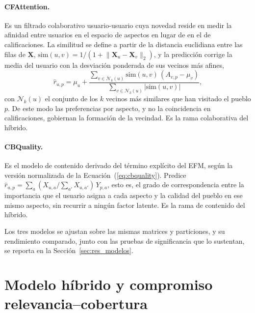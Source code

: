 \paragraph{CFAttention.} Es un filtrado colaborativo usuario-usuario cuya novedad reside en medir
la afinidad entre usuarios en el espacio de aspectos en lugar de en el de calificaciones. La
similitud se define a partir de la distancia euclidiana entre las filas de $\mathbf{X}$,
$\text{sim}(u,v) = 1 / (1 + \lVert \mathbf{X}_u - \mathbf{X}_v \rVert_2)$, y la predicción corrige
la media del usuario con la desviación ponderada de sus vecinos más afines,
\begin{equation}\label{eq:cfattention}
	\hat{r}_{u,p} = \mu_u + \frac{\sum_{v \in \mathcal{N}_k(u)} \text{sim}(u,v)\, (A_{v,p} - \mu_v)}
	{\sum_{v \in \mathcal{N}_k(u)} |\text{sim}(u,v)|},
\end{equation}
con $\mathcal{N}_k(u)$ el conjunto de los $k$ vecinos más similares que han visitado el pueblo
$p$. De este modo las preferencias por aspecto, y no la coincidencia en calificaciones, gobiernan
la formación de la vecindad. Es la rama colaborativa del híbrido.

\paragraph{CBQuality.} Es el modelo de contenido derivado del término explícito del EFM, según la
versión normalizada de la Ecuación~(\ref{eq:cbquality}). Predice
$\hat{r}_{u,p} = \sum_{a} (X_{u,a} / \sum_{a'} X_{u,a'})\, Y_{p,a}$, esto es, el grado de
correspondencia entre la importancia que el usuario asigna a cada aspecto y la calidad del pueblo
en ese mismo aspecto, sin recurrir a ningún factor latente. Es la rama de contenido del híbrido.

Los tres modelos se ajustan sobre las mismas matrices y particiones, y su rendimiento
comparado, junto con las pruebas de significancia que lo sustentan, se reporta en la
Sección~\ref{sec:res_modelos}.

\section{Modelo híbrido y compromiso relevancia--cobertura}\label{sec:hibrido}

